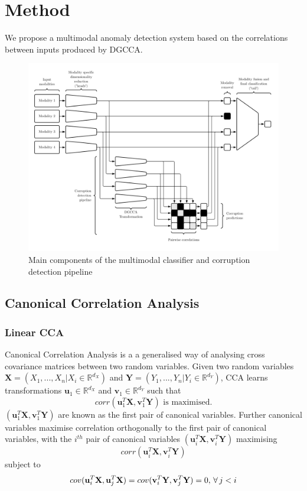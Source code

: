 \chapter{Method}

We propose a multimodal anomaly detection system based on the correlations between inputs produced by DGCCA.

\begin{figure}[H]
    \centering
    \includegraphics[width=\textwidth]{images/pipeline.png}
    \caption{Main components of the multimodal classifier and corruption detection pipeline}
    \label{fig:pipeline}
\end{figure}

\section{Canonical Correlation Analysis}
\subsection{Linear CCA}
Canonical Correlation Analysis \cite{CCA} is a a generalised way of analysing cross covariance matrices between two random variables. Given two random variables $\mathbf{X}=(X_1,...,X_n | X_i\in\mathbb{R}^{d_X})$ and $\mathbf{Y}=(Y_1,...,Y_n | Y_i\in\mathbb{R}^{d_Y})$, CCA learns transformations $\mathbf{u}_1\in\mathbb{R}^{d_X}$ and $\mathbf{v}_1\in\mathbb{R}^{d_Y}$ such that $$corr(\mathbf{u}_1^T\mathbf{X}, \mathbf{v}_1^T\mathbf{Y}) \textrm{ is maximised.}$$ $(\mathbf{u}_1^T\mathbf{X}, \mathbf{v}_1^T\mathbf{Y})$ are known as the first pair of canonical variables. Further canonical variables maximise correlation orthogonally to the first pair of canonical variables, with the $i^{th}$ pair of canonical variables $(\mathbf{u}_i^T\mathbf{X}, \mathbf{v}_i^T\mathbf{Y})$ maximising $$corr(\mathbf{u}_i^T\mathbf{X}, \mathbf{v}_i^T\mathbf{Y})$$ subject to $$cov(\mathbf{u}_i^T\mathbf{X}, \mathbf{u}_j^T\mathbf{X}) = cov(\mathbf{v}_i^T\mathbf{Y}, \mathbf{v}_j^T\mathbf{Y}) = 0,\thinspace  \forall \thinspace  j<i$$

